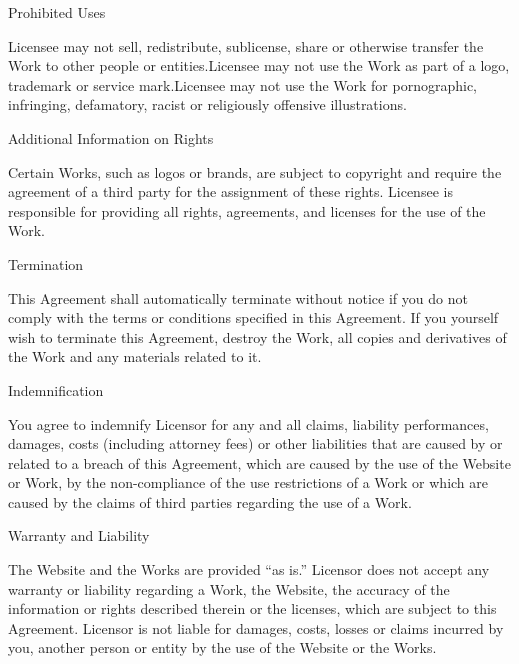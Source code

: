 \begin{DoxyEnumerate}
\item Prohibited Uses
\end{DoxyEnumerate}

Licensee may not sell, redistribute, sublicense, share or otherwise transfer the Work to other people or entities.\+Licensee may not use the Work as part of a logo, trademark or service mark.\+Licensee may not use the Work for pornographic, infringing, defamatory, racist or religiously offensive illustrations.


\begin{DoxyEnumerate}
\item Additional Information on Rights
\end{DoxyEnumerate}

Certain Works, such as logos or brands, are subject to copyright and require the agreement of a third party for the assignment of these rights. Licensee is responsible for providing all rights, agreements, and licenses for the use of the Work.


\begin{DoxyEnumerate}
\item Termination
\end{DoxyEnumerate}

This Agreement shall automatically terminate without notice if you do not comply with the terms or conditions specified in this Agreement. If you yourself wish to terminate this Agreement, destroy the Work, all copies and derivatives of the Work and any materials related to it.


\begin{DoxyEnumerate}
\item Indemnification
\end{DoxyEnumerate}

You agree to indemnify Licensor for any and all claims, liability performances, damages, costs (including attorney fees) or other liabilities that are caused by or related to a breach of this Agreement, which are caused by the use of the Website or Work, by the non-\/compliance of the use restrictions of a Work or which are caused by the claims of third parties regarding the use of a Work.


\begin{DoxyEnumerate}
\item Warranty and Liability
\end{DoxyEnumerate}

The Website and the Works are provided “as is.\+” Licensor does not accept any warranty or liability regarding a Work, the Website, the accuracy of the information or rights described therein or the licenses, which are subject to this Agreement. Licensor is not liable for damages, costs, losses or claims incurred by you, another person or entity by the use of the Website or the Works.

